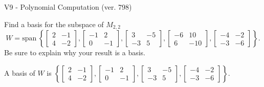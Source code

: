 \begin{exercise}
  \begin{exerciseTitle}V9 - Polynomial Computation (ver. 798)\end{exerciseTitle}
  \begin{exerciseStatement}
    Find a basis for the subspace of \(M_{2,2}\) 
\[W=\mathrm{span}\ \left\{\left[\begin{array}{cc}
2 & -1 \\
4 & -2
\end{array}\right] , \left[\begin{array}{cc}
-1 & 2 \\
0 & -1
\end{array}\right] , \left[\begin{array}{cc}
3 & -5 \\
-3 & 5
\end{array}\right] , \left[\begin{array}{cc}
-6 & 10 \\
6 & -10
\end{array}\right] , \left[\begin{array}{cc}
-4 & -2 \\
-3 & -6
\end{array}\right]\right\}.\]
 Be sure to explain why your result is a basis.


  \end{exerciseStatement}
  \begin{exerciseAnswer}
   A basis of \(W\) is  \(\left\{\left[\begin{array}{cc}
2 & -1 \\
4 & -2
\end{array}\right] , \left[\begin{array}{cc}
-1 & 2 \\
0 & -1
\end{array}\right] , \left[\begin{array}{cc}
3 & -5 \\
-3 & 5
\end{array}\right] , \left[\begin{array}{cc}
-4 & -2 \\
-3 & -6
\end{array}\right]\right\}\).
  


  \end{exerciseAnswer}
\end{exercise}